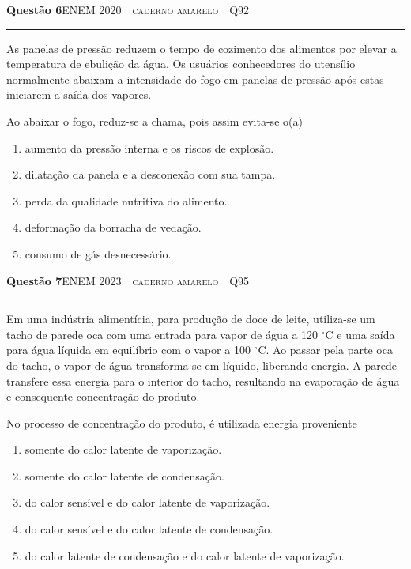 \documentclass[11pt,a4paper]{article}
\newcommand{\fonte}[1]{{\small\scshape\color{grafite}#1}}
\newenvironment{questao}[2]{%
  \needspace{6\baselineskip}
  \par\addvspace{1.6em}
  {\large\bfseries\color{vinho}Quest\~ao #1}\hfill #2\\[-0.55em]
  {\color{black!25}\rule{\linewidth}{0.4pt}}
  \par\nobreak\smallskip
}{\par\addvspace{0.4em}}
\begin{document}
\begin{questao}{6}{\fonte{ENEM 2020 \,\textperiodcentered\, caderno amarelo \,\textperiodcentered\, Q92}}
As panelas de press\~ao reduzem o tempo de cozimento dos alimentos por
elevar a temperatura de ebuli\c{c}\~ao da \'agua. Os usu\'arios conhecedores
do utens\'ilio normalmente abaixam a intensidade do fogo em panelas de
press\~ao ap\'os estas iniciarem a sa\'ida dos vapores.

Ao abaixar o fogo, reduz-se a chama, pois assim evita-se o(a)
\begin{enumerate}
  \item aumento da press\~ao interna e os riscos de explos\~ao.
  \item dilata\c{c}\~ao da panela e a desconex\~ao com sua tampa.
  \item perda da qualidade nutritiva do alimento.
  \item deforma\c{c}\~ao da borracha de veda\c{c}\~ao.
  \item consumo de g\'as desnecess\'ario.
\end{enumerate}
\end{questao}

\begin{questao}{7}{\fonte{ENEM 2023 \,\textperiodcentered\, caderno amarelo \,\textperiodcentered\, Q95}}
Em uma ind\'ustria aliment\'icia, para produ\c{c}\~ao de doce de leite,
utiliza-se um tacho de parede oca com uma entrada para vapor de \'agua a
120 $^\circ$C e uma sa\'ida para \'agua l\'iquida em equil\'ibrio com o vapor
a 100 $^\circ$C. Ao passar pela parte oca do tacho, o vapor de \'agua
transforma-se em l\'iquido, liberando energia. A parede transfere essa
energia para o interior do tacho, resultando na evapora\c{c}\~ao de \'agua e
consequente concentra\c{c}\~ao do produto.

No processo de concentra\c{c}\~ao do produto, \'e utilizada energia proveniente
\begin{enumerate}
  \item somente do calor latente de vaporiza\c{c}\~ao.
  \item somente do calor latente de condensa\c{c}\~ao.
  \item do calor sens\'ivel e do calor latente de vaporiza\c{c}\~ao.
  \item do calor sens\'ivel e do calor latente de condensa\c{c}\~ao.
  \item do calor latente de condensa\c{c}\~ao e do calor latente de
        vaporiza\c{c}\~ao.
\end{enumerate}
\end{questao}
\end{document}
